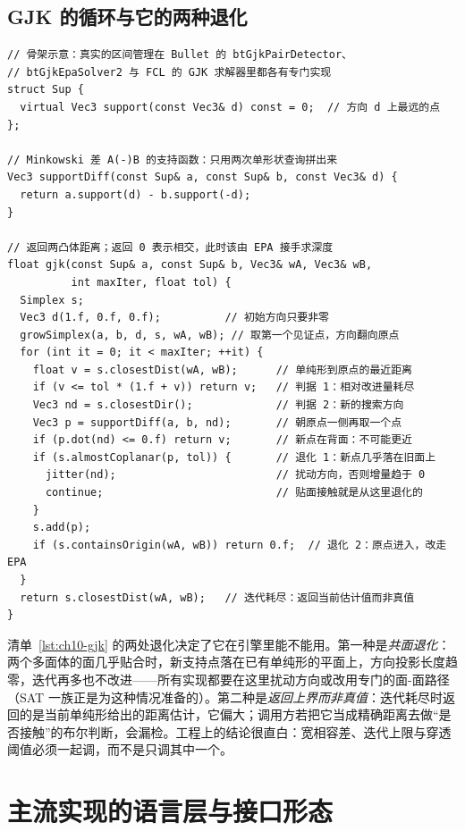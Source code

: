 \documentclass[12pt,a4paper,fontset=fandol]{ctexbook}
\begin{document}
\subsection{GJK 的循环与它的两种退化}

\begin{lstlisting}[style=cppstyle,label={lst:ch10-gjk},caption={GJK 距离迭代的核心循环：单纯形、收敛判据与退化处理}]
// 骨架示意：真实的区间管理在 Bullet 的 btGjkPairDetector、
// btGjkEpaSolver2 与 FCL 的 GJK 求解器里都各有专门实现
struct Sup {
  virtual Vec3 support(const Vec3& d) const = 0;  // 方向 d 上最远的点
};

// Minkowski 差 A(-)B 的支持函数：只用两次单形状查询拼出来
Vec3 supportDiff(const Sup& a, const Sup& b, const Vec3& d) {
  return a.support(d) - b.support(-d);
}

// 返回两凸体距离；返回 0 表示相交，此时该由 EPA 接手求深度
float gjk(const Sup& a, const Sup& b, Vec3& wA, Vec3& wB,
          int maxIter, float tol) {
  Simplex s;
  Vec3 d(1.f, 0.f, 0.f);          // 初始方向只要非零
  growSimplex(a, b, d, s, wA, wB); // 取第一个见证点，方向翻向原点
  for (int it = 0; it < maxIter; ++it) {
    float v = s.closestDist(wA, wB);      // 单纯形到原点的最近距离
    if (v <= tol * (1.f + v)) return v;   // 判据 1：相对改进量耗尽
    Vec3 nd = s.closestDir();             // 判据 2：新的搜索方向
    Vec3 p = supportDiff(a, b, nd);       // 朝原点一侧再取一个点
    if (p.dot(nd) <= 0.f) return v;       // 新点在背面：不可能更近
    if (s.almostCoplanar(p, tol)) {       // 退化 1：新点几乎落在旧面上
      jitter(nd);                         // 扰动方向，否则增量趋于 0
      continue;                           // 贴面接触就是从这里退化的
    }
    s.add(p);
    if (s.containsOrigin(wA, wB)) return 0.f;  // 退化 2：原点进入，改走 EPA
  }
  return s.closestDist(wA, wB);   // 迭代耗尽：返回当前估计值而非真值
}
\end{lstlisting}

清单~\ref{lst:ch10-gjk} 的两处退化决定了它在引擎里能不能用。第一种是\emph{共面退化}：两个多面体的面几乎贴合时，新支持点落在已有单纯形的平面上，方向投影长度趋零，迭代再多也不改进——所有实现都要在这里扰动方向或改用专门的面-面路径（SAT 一族正是为这种情况准备的）。第二种是\emph{返回上界而非真值}：迭代耗尽时返回的是当前单纯形给出的距离估计，它偏大；调用方若把它当成精确距离去做``是否接触''的布尔判断，会漏检。工程上的结论很直白：宽相容差、迭代上限与穿透阈值必须一起调，而不是只调其中一个。

\section{主流实现的语言层与接口形态}
\end{document}
